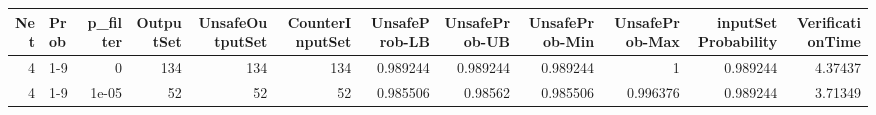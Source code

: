 \begin{tabular}{rlrrrrrrrrrr}
\hline
   Net & Prob   &   p\_filter &   OutputSet &   UnsafeOutputSet &   CounterInputSet &   UnsafeProb-LB &   UnsafeProb-UB &   UnsafeProb-Min &   UnsafeProb-Max &   inputSet Probability &   VerificationTime \\
\hline
     4 & 1-9    &      0     &         134 &               134 &               134 &        0.989244 &        0.989244 &         0.989244 &         1        &               0.989244 &            4.37437 \\
     4 & 1-9    &      1e-05 &          52 &                52 &                52 &        0.985506 &        0.98562  &         0.985506 &         0.996376 &               0.989244 &            3.71349 \\
\hline
\end{tabular}
